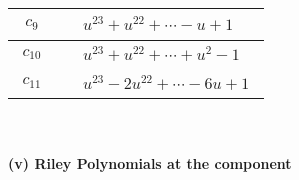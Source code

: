 \documentclass[1p]{elsarticle_modified}
\theoremstyle{definition}
\begin{document}
\begin{tabular}{m{50pt}|m{274pt}}
\hline $$\begin{aligned}c_{9}\end{aligned}$$&$\begin{aligned}
&u^{23}+u^{22}+\cdots- u+1
\end{aligned}$\\
\hline $$\begin{aligned}c_{10}\end{aligned}$$&$\begin{aligned}
&u^{23}+u^{22}+\cdots+u^2-1
\end{aligned}$\\
\hline $$\begin{aligned}c_{11}\end{aligned}$$&$\begin{aligned}
&u^{23}-2 u^{22}+\cdots-6 u+1
\end{aligned}$\\
\hline
\end{tabular}\\~\\
\newpage\renewcommand{\arraystretch}{1}
\flushleft \textbf{(v) Riley Polynomials at the component}\newline \\
\end{document}
